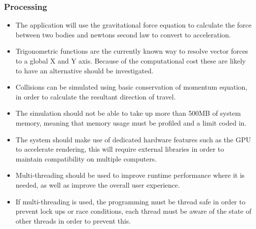 \subsubsection{Processing}
\begin{itemize}
\item The application will use the gravitational force equation to calculate the force between two bodies and newtons second law to convert to acceleration.
\item Trigonometric functions are the currently known way to resolve vector forces to a global X and Y axis. Because of the computational cost these are likely to have an alternative should be investigated.
\item Collisions can be simulated using basic conservation of momentum equation, in order to calculate the resultant direction of travel.
\item The simulation should not be able to take up more than 500MB of system memory, meaning that memory usage must be profiled and a limit coded in.
\item The system should make use of dedicated hardware features such as the GPU to accelerate rendering, this will require external libraries in order to maintain compatibility on multiple computers.
\item Multi-threading should be used to improve runtime performance where it is needed, as well as improve the overall user experience.
\item If multi-threading is used, the programming must be thread safe in order to prevent lock ups or race conditions, each thread must be aware of the state of other threads in order to prevent this.

\end{itemize}

